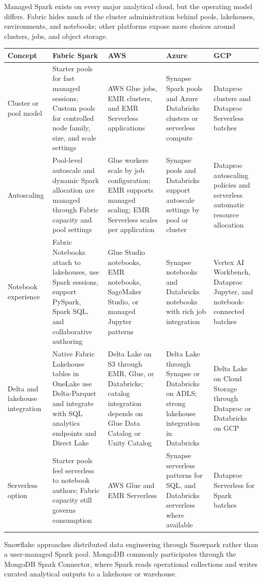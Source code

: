 \begin{crosscloud}
Managed Spark exists on every major analytical cloud, but the operating model differs. Fabric hides much of the cluster administration behind pools, lakehouses, environments, and notebooks; other platforms expose more choices around clusters, jobs, and object storage.

\vspace{2mm}
{\footnotesize
\begin{tabular}{@{}p{2.9cm}p{3.2cm}p{3.2cm}p{3.2cm}p{3.2cm}@{}}
\toprule
\textbf{Concept} & \textbf{Fabric Spark} & \textbf{AWS} & \textbf{Azure} & \textbf{GCP} \\
\midrule
Cluster or pool model & Starter pools for fast managed sessions; Custom pools for controlled node family, size, and scale settings & AWS Glue jobs, EMR clusters, and EMR Serverless applications & Synapse Spark pools and Azure Databricks clusters or serverless compute & Dataproc clusters and Dataproc Serverless batches \\
Autoscaling & Pool-level autoscale and dynamic Spark allocation are managed through Fabric capacity and pool settings & Glue workers scale by job configuration; EMR supports managed scaling; EMR Serverless scales per application & Synapse pools and Databricks support autoscale settings by pool or cluster & Dataproc autoscaling policies and serverless automatic resource allocation \\
Notebook experience & Fabric Notebooks attach to lakehouses, use Spark sessions, support PySpark, Spark SQL, and collaborative authoring & Glue Studio notebooks, EMR notebooks, SageMaker Studio, or managed Jupyter patterns & Synapse notebooks and Databricks notebooks with rich job integration & Vertex AI Workbench, Dataproc Jupyter, and notebook-connected batches \\
Delta and lakehouse integration & Native Fabric Lakehouse tables in OneLake use Delta-Parquet and integrate with SQL analytics endpoints and Direct Lake & Delta Lake on S3 through EMR, Glue, or Databricks; catalog integration depends on Glue Data Catalog or Unity Catalog & Delta Lake through Synapse or Databricks on ADLS; strong lakehouse integration in Databricks & Delta Lake on Cloud Storage through Dataproc or Databricks on GCP \\
Serverless option & Starter pools feel serverless to notebook authors; Fabric capacity still governs consumption & AWS Glue and EMR Serverless & Synapse serverless patterns for SQL, and Databricks serverless where available & Dataproc Serverless for Spark batches \\
\bottomrule
\end{tabular}}

\vspace{1mm}
Snowflake approaches distributed data engineering through Snowpark rather than a user-managed Spark pool. MongoDB commonly participates through the MongoDB Spark Connector, where Spark reads operational collections and writes curated analytical outputs to a lakehouse or warehouse.
\end{crosscloud}

